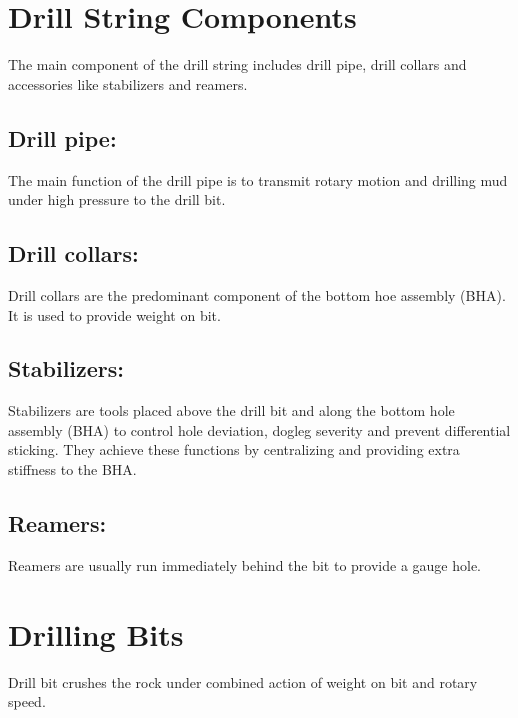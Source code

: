 \section{Drill String Components}

The main component of the drill string includes drill pipe,
drill collars and accessories like stabilizers and reamers.
 	
\vspace{1em}

\subsection*{\textbf{Drill pipe:}} The main function of the drill pipe is to transmit rotary motion and
drilling mud under high pressure to the drill bit.

\vspace{1em}

\subsection*{\textbf{Drill collars:}} Drill collars are the predominant component of the bottom hoe assembly (BHA). 
It is used to provide weight on bit.

\vspace{1em}

\subsection*{\textbf{Stabilizers:}} Stabilizers are tools placed above the drill bit and along the bottom hole assembly (BHA)
to control hole deviation, dogleg severity and prevent differential sticking. 
They achieve these functions by centralizing and providing extra stiffness to the BHA.

\vspace{1em}


\subsection*{\textbf{Reamers:}} Reamers are usually run immediately behind the bit to provide a gauge hole.


\section*{Drilling Bits}

Drill bit crushes the rock under combined action of weight on bit and rotary speed.

